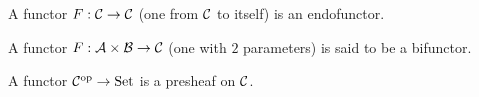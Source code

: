 \begin{definition}
  A functor $F:\mathcal{C}\to \mathcal{C}$ (one from $\mathcal{C}$ to itself) is an endofunctor.
  \parencite{adamek_herrlich_strecker:joy_cats}
\end{definition}

\begin{definition}
  A functor $F:\mathcal{A}\times \mathcal{B} \to \mathcal{C}$ (one with $2$ parameters) is said to be a
  bifunctor.
  \parencite{lane:working_mathematician}
\end{definition}

\begin{definition}
  A functor $\mathcal{C}^{\mathrm{op}} \to \mathrm{Set}$ is a presheaf on $\mathcal{C}$.
  \parencite{leinster:basic_category_theory}
\end{definition}